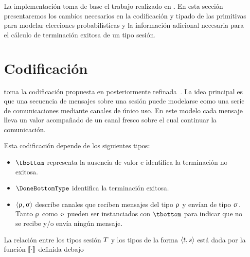 \label{cap:implementacion}
La implementación toma de base el trabajo realizado en \FuSe. En esta sección
presentaremos los cambios necesarios en la codificación y tipado de las
primitivas para modelar elecciones probabilísticas y la información
adicional necesaria para el cálculo de terminación exitosa de un tipo sesión.

\section{Codificación}

\FuSe toma la codificación propuesta en \cite{Dardha}
posteriormente refinada~\cite{DBLP:journals/jfp/Padovani17}. La
idea principal es que una secuencia de mensajes sobre una sesión puede
modelarse como una serie de comunicaciones mediante canales de único uso. En
este modelo cada mensaje lleva un valor acompañado de un canal fresco sobre el
cual continuar la comunicación.

Esta codificación depende de los siguientes tipos:

\begin{itemize}
	\item $\tbottom$ representa la ausencia de valor e identifica la
		terminación no exitosa.
	\item $\DoneBottomType$ identifica la terminación exitosa.
	\item $\langle\uprho_{},\upsigma_{}\rangle$ describe canales que
		reciben mensajes del tipo $\uprho_{}$ y envían de tipo $\upsigma_{}$.
		Tanto $\uprho_{}$ como $\upsigma_{}$ pueden ser instanciados con
		$\tbottom$ para indicar que no se recibe y/o envía ningún
		mensaje.
\end{itemize}

La relación entre los tipos sesión $T$ y los tipos de la forma
$\langle t,s\rangle$ está dada por la función $\llbracket\cdot\rrbracket$ definida debajo

